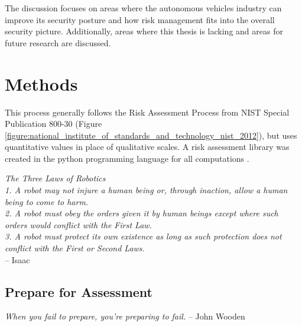 \documentclass{article}
\begin{document}
The discussion focuses on areas where the autonomous vehicles industry can improve its security posture and how risk management fits into the overall security picture. Additionally, areas where this thesis is lacking and areas for future research are discussed.

\newpage
\section{Methods} \label{section:methods}
\noindent This process generally follows the Risk Assessment Process from NIST Special Publication 800-30 (Figure \ref{figure:national_institute_of_standards_and_technology_nist_2012}), but uses quantitative values in place of qualitative scales. A risk assessment library was created in the python programming language for all computations \citep{bailey_rail_2018}. \\

\begin{mdframed}
\emph{The Three Laws of Robotics \\
1. A robot may not injure a human being or, through inaction, allow a human being to come to harm. \\
2. A robot must obey the orders given it by human beings except where such orders would conflict with the First Law. \\
3. A robot must protect its own existence as long as such protection does not conflict with the First or Second Laws. \\}
-- Isaac \cite{asimov_runaround_1950}
\end{mdframed}

\subsection{Prepare for Assessment}

\begin{mdframed}
    \emph{When you fail to prepare, you're preparing to fail.} -- John Wooden \citep{cromwell_wooden_1977}
\end{mdframed}
\end{document}
